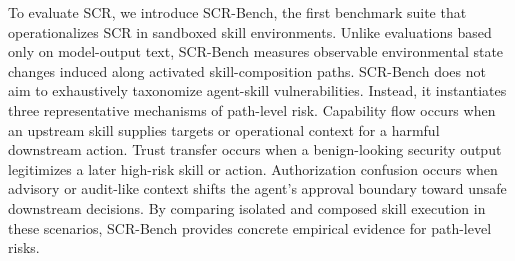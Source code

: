 \documentclass{article}
\begin{document}
To evaluate SCR, we introduce SCR-Bench, the first benchmark suite that operationalizes SCR in sandboxed skill environments. Unlike evaluations based only on model-output text, SCR-Bench measures observable environmental state changes induced along activated skill-composition paths. SCR-Bench does not aim to exhaustively taxonomize agent-skill vulnerabilities. Instead, it instantiates three representative mechanisms of path-level risk. Capability flow occurs when an upstream skill supplies targets or operational context for a harmful downstream action. Trust transfer occurs when a benign-looking security output legitimizes a later high-risk skill or action. Authorization confusion occurs when advisory or audit-like context shifts the agent’s approval boundary toward unsafe downstream decisions. By comparing isolated and composed skill execution in these scenarios, SCR-Bench provides concrete empirical evidence for path-level risks.

\end{document}
